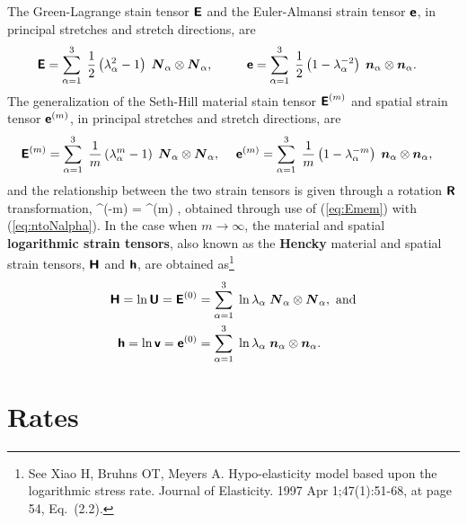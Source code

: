 The Green-Lagrange stain tensor $\mbox{\sffamily\bfseries E}$ and the Euler-Almansi strain tensor $\mbox{\sffamily\bfseries e}$, in principal stretches and stretch directions, are
\begin{align}
\mbox{\sffamily\bfseries E} = \sum_{\alpha = 1}^3 \; \frac{1}{2} \left(\lambda^2_{\alpha} - 1 \right)\;\mbox{\boldmath $N$}_{\alpha} \otimes \mbox{\boldmath $N$}_{\alpha}, \hspace{1cm} 
& 
\mbox{\sffamily\bfseries e} = \sum_{\alpha = 1}^3 \; \frac{1}{2} \left(1 - \lambda^{-2}_{\alpha} \right) \;\mbox{\boldmath $n$}_{\alpha} \otimes \mbox{\boldmath $n$}_{\alpha}.
\end{align}
The generalization of the Seth-Hill material stain tensor $\mbox{\sffamily\bfseries E}^{(m)}$ and spatial strain tensor $\mbox{\sffamily\bfseries e}^{(m)}$, in principal stretches and stretch directions, are
\begin{align}
    \mbox{\sffamily\bfseries E}^{(m)} = \sum_{\alpha = 1}^3 \; \frac{1}{m} \left(\lambda^m_{\alpha} - 1 \right)\;\mbox{\boldmath $N$}_{\alpha} \otimes \mbox{\boldmath $N$}_{\alpha}, \hspace{0.5cm} 
& 
    \mbox{\sffamily\bfseries e}^{(m)} = \sum_{\alpha = 1}^3 \; \frac{1}{m} \left(1 - \lambda^{-m}_{\alpha} \right) \;\mbox{\boldmath $n$}_{\alpha} \otimes \mbox{\boldmath $n$}_{\alpha}, 
    \label{eq:Emem}
\end{align}
and the relationship between the two strain tensors is given through a rotation $\mbox{\sffamily\bfseries R}$ transformation,
\be
\tebold^{(-m)} = \tRbold \tEbold^{(m)} \tRbold\transpose,
\ee
obtained through use of (\ref{eq:Emem}) with (\ref{eq:ntoNalpha}).
In the case when $m \rightarrow \infty$, the material and spatial {\bf logarithmic strain tensors}, also known as the {\bf Hencky} material and spatial strain tensors, $\mbox{\sffamily\bfseries H}$ and $\mbox{\sffamily\bfseries h}$, are obtained as\footnote{See Xiao H, Bruhns OT, Meyers A. Hypo-elasticity model based upon the logarithmic stress rate. Journal of Elasticity. 1997 Apr 1;47(1):51-68, at page 54, Eq.~(2.2).}
\begin{align}
    \mbox{\sffamily\bfseries H} = \ln \mbox{\sffamily\bfseries U} = \mbox{\sffamily\bfseries E}^{(0)} & = \sum_{\alpha = 1}^3 \; \ln \lambda_{\alpha} \;\mbox{\boldmath $N$}_{\alpha} \otimes \mbox{\boldmath $N$}_{\alpha}, \mbox{ and}
\\
    \mbox{\sffamily\bfseries h} = \ln \mbox{\sffamily\bfseries v} = \mbox{\sffamily\bfseries e}^{(0)} & = \sum_{\alpha = 1}^3 \; \ln \lambda_{\alpha} \;\mbox{\boldmath $n$}_{\alpha} \otimes \mbox{\boldmath $n$}_{\alpha}.
\end{align}


\clearpage
\section{Rates}
